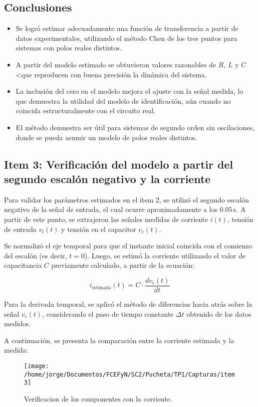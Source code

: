 \documentclass{article}
\begin{document}
\subsection*{Conclusiones}
\begin{itemize}
    \item Se logró estimar adecuadamente una función de transferencia a partir de datos experimentales, utilizando el método Chen de los tres puntos para sistemas con polos reales distintos.
    \item A partir del modelo estimado se obtuvieron valores razonables de $R$, $L$ y $C$ <que reproducen con buena precisión la dinámica del sistema.
    \item La inclusión del cero en el modelo mejora el ajuste con la señal medida, lo que demuestra la utilidad del modelo de identificación, aún cuando no coincida estructuralmente con el circuito real.
    \item El método demuestra ser útil para sistemas de segundo orden sin oscilaciones, donde se pueda asumir un modelo de polos reales distintos.
\end{itemize}

\subsection{Item 3: Verificación del modelo a partir del segundo escalón negativo y la corriente}

Para validar los parámetros estimados en el ítem 2, se utilizó el segundo escalón negativo de la señal de entrada, el cual ocurre aproximadamente a los $0.05\,$s. A partir de este punto, se extrajeron las señales medidas de corriente $i(t)$, tensión de entrada $v_i(t)$ y tensión en el capacitor $v_c(t)$.

Se normalizó el eje temporal para que el instante inicial coincida con el comienzo del escalón (es decir, $t=0$). Luego, se estimó la corriente utilizando el valor de capacitancia $C$ previamente calculado, a partir de la ecuación:

\[
i_{\text{estimada}}(t) = C \cdot \frac{d v_c(t)}{dt}
\]

Para la derivada temporal, se aplicó el método de diferencias hacia atrás sobre la señal $v_c(t)$, considerando el paso de tiempo constante $\Delta t$ obtenido de los datos medidos.

A continuación, se presenta la comparación entre la corriente estimada y la medida:

\begin{figure}[ht!]
      \centering
        \texttt{[image: /home/jorge/Documentos/FCEFyN/SC2/Pucheta/TP1/Capturas/item3]}
          \caption{Verificacion de los componentes con la corriente.}
            \label{fig:etiqueta4}
        \end{figure} 
\end{document}
